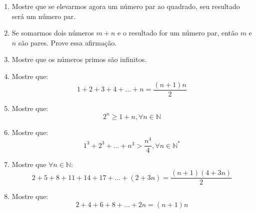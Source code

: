 \documentclass[oneside,a4paper,12pt]{article}
\begin{document}
\begin{enumerate}
	\item Mostre que se elevarmos agora um número par ao quadrado, seu resultado será um número par.

	\item Se somarmos dois números $m + n$ e o resultado for um número par, então $m$ e $n$ são pares. Prove essa afirmação.

	\item Mostre que os números primos são infinitos.
	
	\item Mostre que:
	$$1+2+3+4+\dots+n = \frac{(n+1)n}{2}$$

	\item Mostre que:
	$$2^{n} \geq 1 + n ,\forall n \in \mathbb{N}$$
	
	
	\item Mostre que:
	$$1^3 + 2^3 + \dots + n^3 > \frac{n^4}{4}, \forall n \in \mathbb{N}^{*}$$

	\item Mostre que $\forall n \in \mathbb{N}$:
	$$2+5+8+11+14+17+\dots+(2+3n) = \frac{(n+1)(4+3n)}{2}$$
	
	\item Mostre que:
	$$ 2+4+6+8+\dots+2n = (n+1)n$$

\end{enumerate}


	
\end{document}
